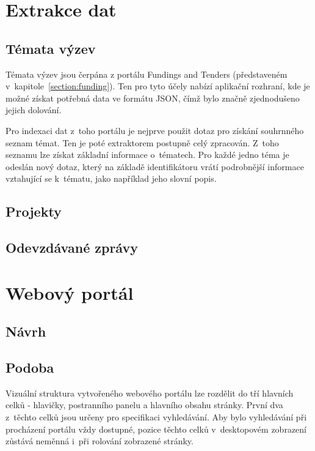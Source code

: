\blindtext[2]

\section{Extrakce dat}
\blindtext

\subsection{Témata výzev}
Témata výzev jsou čerpána z portálu Fundings and Tenders (představeném v~kapitole~\ref{section:funding}).
Ten pro tyto účely nabízí aplikační rozhraní, kde je možné získat potřebná data ve formátu JSON, čímž bylo značně zjednodušeno jejich dolování. 

Pro indexaci dat z~toho portálu je nejprve použit dotaz pro získání souhrnného seznam témat. Ten je poté extraktorem postupně celý zpracován. Z~toho seznamu lze získat základní informace o~tématech. Pro každé jedno téma je odeslán nový dotaz, který na základě identifikátoru vrátí podrobnější informace vztahující se k~tématu, jako například jeho slovní popis.

\subsection{Projekty}
\blindtext

\subsection{Odevzdávané zprávy}
\blindtext



\section{Webový portál}
\blindtext

\subsection{Návrh}
\blindtext

\subsection{Podoba}
Vizuální struktura vytvořeného webového portálu lze rozdělit do tří hlavních celků - hlavičky, postranního panelu a hlavního obsahu stránky. První dva z~těchto celků jsou určeny pro specifikaci vyhledávání. Aby bylo vyhledávání při procházení portálu vždy dostupné, pozice těchto celků v~desktopovém zobrazení zůstává neměnná i~při rolování zobrazené stránky.

